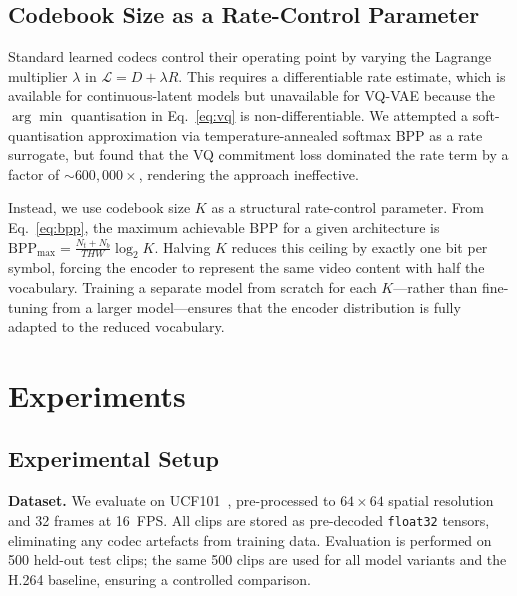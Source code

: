 \documentclass[sigconf, screen, review, anonymous]{acmart}
\begin{document}
\subsection{Codebook Size as a Rate-Control Parameter}
\label{sec:ksweep}

Standard learned codecs control their operating point by varying the
Lagrange multiplier $\lambda$ in $\mathcal{L} = D + \lambda R$. This
requires a differentiable rate estimate, which is available for
continuous-latent models but unavailable for VQ-VAE because the
$\arg\min$ quantisation in Eq.~\eqref{eq:vq} is non-differentiable.
We attempted a soft-quantisation approximation via temperature-annealed
softmax BPP as a rate surrogate, but found that the VQ commitment loss
dominated the rate term by a factor of ${\sim}600{,}000\times$,
rendering the approach ineffective.

Instead, we use codebook size $K$ as a structural rate-control
parameter. From Eq.~\eqref{eq:bpp}, the maximum achievable BPP for a
given architecture is $\mathrm{BPP}_{\max} = \tfrac{N_t+N_b}{THW}
\log_2 K$. Halving $K$ reduces this ceiling by exactly one bit per
symbol, forcing the encoder to represent the same video content with
half the vocabulary. Training a separate model from scratch for each
$K$---rather than fine-tuning from a larger model---ensures that the
encoder distribution is fully adapted to the reduced vocabulary.

\section{Experiments}
\label{sec:experiments}

\subsection{Experimental Setup}

\noindent\textbf{Dataset.}
We evaluate on UCF101~\cite{soomro2012ucf101}, pre-processed to
$64\!\times\!64$ spatial resolution and 32 frames at 16~FPS. All clips
are stored as pre-decoded \texttt{float32} tensors, eliminating any
codec artefacts from training data. Evaluation is performed on 500
held-out test clips; the same 500 clips are used for all model variants
and the H.264 baseline, ensuring a controlled comparison.
\end{document}
